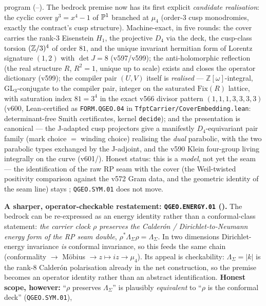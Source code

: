 \begin{keybox}
{program (--).} The bedrock premise now
has its first explicit \emph{candidate realisation}: the cyclic cover $y^3=x^4-1$ of $\mathbb P^1$ branched at
$\mu_4$ (order-$3$ cusp monodromies, exactly the contract's cusp structure).  Machine-exact, in five
rounds: the cover carries the rank-$3$ Eisenstein $H_1$, the projective $D_4$ via the deck, the
cusp-class torsion $(\mathbb Z/3)^4$ of order $81$, and the unique invariant hermitian form of Lorentz
signature $(1,2)$ with $\det J=8$ (v597/v599); the anti-holomorphic reflection (the real structure $R$,
$R^2{=}1$, unique up to scale) exists and closes the operator dictionary (v599); the compiler pair
$(U,V)$ itself is \emph{realised} --- $\mathbb{Z}[\omega]$-integral, GL$_3$-conjugate to the compiler
pair, integer on the saturated $\mathrm{Fix}(R)$ lattice, with saturation index $81=3^4$ in the exact
v566 divisor pattern $(1,1,1,3,3,3,3)$ (v600, Lean-certified as \texttt{FORM.QGEO.04} in
\texttt{TfptCarrier/CoverEmbedding.lean}: determinant-free Smith certificates, kernel \texttt{decide});
and the presentation is canonical --- the J-adapted cusp projectors give a manifestly $D_4$-equivariant
pair family (mark choice $=$ winding choice) realising the \emph{dual} parabolic, with the two parabolic
types exchanged by the J-adjoint, and the v590 Klein four-group living integrally on the curve
(v601/).  Honest status: this is a \emph{model}, not yet the seam --- the
identification of the raw RP seam with the cover (the Weil-twisted positivity comparison against the
v572 Gram data, and the geometric identity of the seam line) stays \mO; \texttt{QGEO.SYM.01} does not
move.
\par\smallskip\noindent\textbf{A sharper, operator-checkable restatement: \texttt{QGEO.ENERGY.01}
().} The bedrock can be re-expressed as an energy identity rather than a
conformal-class statement: \emph{the carrier clock $\rho$ preserves the Calder\'on / Dirichlet-to-Neumann
energy form of the RP seam double}, $\rho^*\Lambda_\Sigma\rho=\Lambda_\Sigma$. In two dimensions
Dirichlet-energy invariance \emph{is} conformal invariance, so this feeds the same chain
(conformality $\to$ M\"obius $\to z\mapsto iz\to\mu_4$). Its appeal is checkability: $\Lambda_\Sigma=|k|$
is the rank-$8$ Calder\'on polarisation already in the net construction, so the premise becomes an operator
identity rather than an abstract identification. \textbf{Honest scope, however:} ``$\rho$ preserves
$\Lambda_\Sigma$'' is plausibly \emph{equivalent} to ``$\rho$ is the conformal deck'' (\texttt{QGEO.SYM.01}),

\end{keybox}
